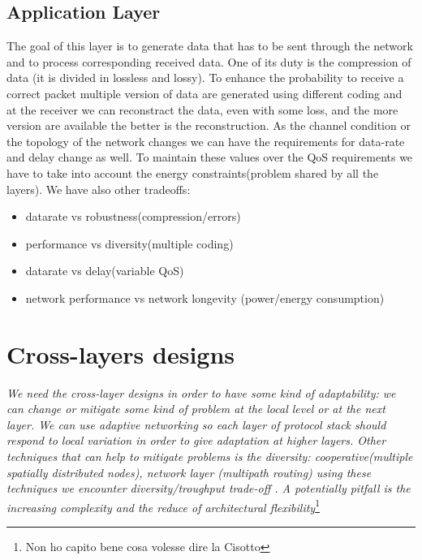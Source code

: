 \subsection{Application Layer}
The goal of this layer is to generate data that has to be sent through the network and to process corresponding received data. One of its duty is the compression of data (it is divided in lossless and lossy).
To enhance the probability to receive a correct packet multiple version of data are generated using different coding and at the receiver we can reconstract the data, even with some loss, and the more version are available the better is the reconstruction.
As the channel condition or the topology of the network changes we can have the requirements for data-rate and delay change as well. To maintain these values over the QoS requirements we have to take into account the energy constraints(problem shared by all the layers). We have also other tradeoffs:
\begin{itemize}
	\item datarate vs robustness(compression/errors)
	\item performance vs diversity(multiple coding)
	\item datarate vs delay(variable QoS)
	\item network performance vs network longevity (power/energy consumption)
\end{itemize}

\section{Cross-layers designs}
\textit{We need the cross-layer designs in order to have some kind of adaptability: we can change or mitigate some kind of problem at the local level or at the next layer. We can use adaptive networking so each layer of protocol stack should respond to local variation in order to give adaptation at higher layers. Other techniques that can help to mitigate problems is the diversity: cooperative(multiple spatially distributed nodes), network layer (multipath routing) using these techniques we encounter diversity/troughput trade-off .
A potentially pitfall is the increasing complexity and the reduce of architectural flexibility}\footnote{Non ho capito bene cosa volesse dire la Cisotto}